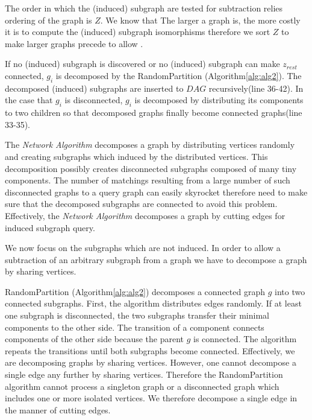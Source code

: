 The order in which the  (induced) subgraph are tested for subtraction relies ordering of the graph is $Z$.
We know that The larger a graph is, the more costly it is to compute the (induced) subgraph isomorphisms therefore we sort $Z$ to make larger graphs precede to allow  .

If no (induced) subgraph is discovered or no (induced) subgraph can make $z_{rest}$ connected, $g_i$ is decomposed by the RandomPartition (Algorithm\ref{alg:alg2}).
The decomposed (induced) subgraphs are inserted to $DAG$ recursively(line 36-42).
In the case that $g_i$ is disconnected, $g_i$ is decomposed by distributing its components to two children so that decomposed graphs finally become connected graphs(line 33-35).



The \textit{Network Algorithm} decomposes a graph by distributing vertices randomly and creating subgraphs which induced by the distributed vertices.
This decomposition possibly creates disconnected subgraphs composed of many tiny components.
The number of matchings resulting from a large number of such disconnected graphs to a query graph can easily skyrocket therefore need to make sure that the decomposed subgraphs are connected to avoid this problem. Effectively, the \textit{Network Algorithm} decomposes a graph by cutting edges for induced subgraph query.

We  now  focus on the subgraphs which are not induced. In order to allow a subtraction of an arbitrary subgraph from a graph we have to decompose a graph by sharing vertices.

RandomPartition (Algorithm\ref{alg:alg2}) decomposes a connected graph $g$ into two connected subgraphs.
First, the algorithm distributes edges randomly. If at least one subgraph is disconnected, the two subgraphs transfer their minimal components to the other side.
The transition of a component connects components of the other side because the parent $g$ is connected.
The algorithm repeats the transitions until both subgraphs become connected. Effectively, we are decomposing graphs by sharing vertices.
However, one  cannot decompose a single edge any further by sharing vertices. Therefore the RandomPartition algorithm cannot process a singleton graph or a disconnected graph which includes one or more isolated vertices. We therefore  decompose a single edge in the manner of cutting edges.

